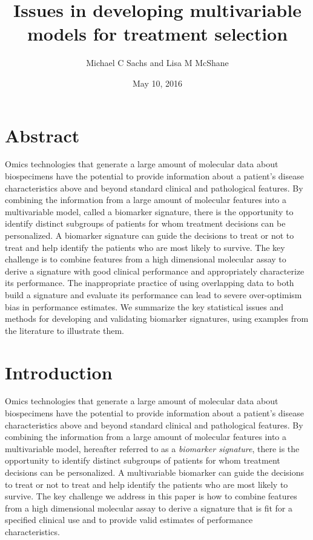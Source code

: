 \documentclass[12pt,]{article}
\title{Issues in developing multivariable models for treatment selection}
\author{Michael C Sachs and Lisa M McShane}
\date{May 10, 2016}
\begin{document}
\maketitle


\section{Abstract}\label{abstract}

Omics technologies that generate a large amount of molecular data about
biospecimens have the potential to provide information about a patient's
disease characteristics above and beyond standard clinical and
pathological features. By combining the information from a large amount
of molecular features into a multivariable model, called a biomarker
signature, there is the opportunity to identify distinct subgroups of
patients for whom treatment decisions can be personalized. A biomarker
signature can guide the decisions to treat or not to treat and help
identify the patients who are most likely to survive. The key challenge
is to combine features from a high dimensional molecular assay to derive
a signature with good clinical performance and appropriately
characterize its performance. The inappropriate practice of using
overlapping data to both build a signature and evaluate its performance
can lead to severe over-optimism bias in performance estimates. We
summarize the key statistical issues and methods for developing and
validating biomarker signatures, using examples from the literature to
illustrate them.

\section{Introduction}\label{introduction}

Omics technologies that generate a large amount of molecular data about
biospecimens have the potential to provide information about a patient's
disease characteristics above and beyond standard clinical and
pathological features. By combining the information from a large amount
of molecular features into a multivariable model, hereafter referred to
as a \emph{biomarker signature}, there is the opportunity to identify
distinct subgroups of patients for whom treatment decisions can be
personalized. A multivariable biomarker can guide the decisions to treat
or not to treat and help identify the patients who are most likely to
survive. The key challenge we address in this paper is how to combine
features from a high dimensional molecular assay to derive a signature
that is fit for a specified clinical use and to provide valid estimates
of performance characteristics.
\end{document}
